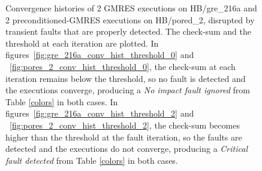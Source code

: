 \begin{figure}[h]
\begin{minipage}[b]{0.48\linewidth}
    
	\end{minipage}
\caption{Convergence histories of 2 GMRES executions on HB/gre_216a and 2 preconditioned-GMRES executions on HB/pored_2, disrupted by transient faults that are properly detected. The check-sum and the threshold at each iteration are plotted. In figures~\ref{fig:gre_216a_conv_hist_threshold_0} and ~\ref{fig:pores_2_conv_hist_threshold_0}, the check-sum at each iteration remains below the threshold, so no fault is detected and the executions converge, producing a \emph{No impact fault ignored} from Table \ref{colors} in both cases. In figures~\ref{fig:gre_216a_conv_hist_threshold_2} and ~\ref{fig:pores_2_conv_hist_threshold_2}, the check-sum becomes higher than the threshold at the fault iteration, so the faults are detected and the executions do not converge, producing a \emph{Critical fault detected} from Table \ref{colors} in both cases. }\label{fig:conv_hist_threshold}
\end{figure}








